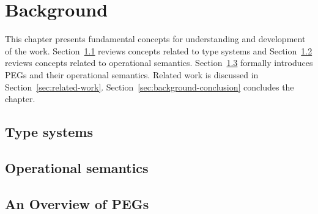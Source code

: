 \chapter{Background}\label{chap:background}

This chapter presents fundamental concepts for understanding and development of the 
work. Section~\ref{sec:type-systems} reviews concepts related to type systems and 
Section~\ref{sec:operational-semantics} reviews concepts related to operational 
semantics. Section~\ref{sec:pegs} formally introduces PEGs and their 
operational semantics. Related work is discussed in Section~\ref{sec:related-work}.
Section~\ref{sec:background-conclusion} concludes the chapter.

\section{Type systems}\label{sec:type-systems}

\section{Operational semantics}\label{sec:operational-semantics}

\section{An Overview of PEGs}\label{sec:pegs}


